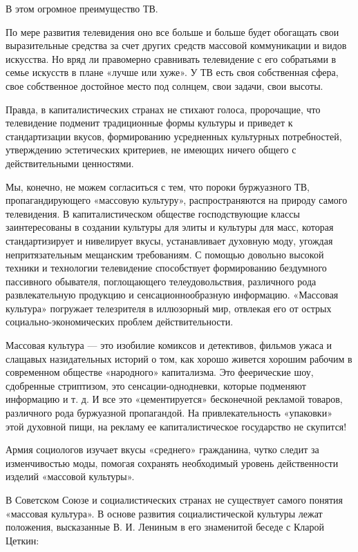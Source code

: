 \documentclass[12pt, a4paper, openany]{book}
\begin{document}
В этом огромное преимущество ТВ. 

По мере развития телевидения оно все больше и больше будет обогащать свои выразительные средства за счет других средств массовой коммуникации и видов искусства. Но вряд ли правомерно сравнивать телевидение с его собратьями в семье искусств в плане «лучше или хуже». У ТВ есть своя собственная сфера, свое собственное достойное место под солнцем, свои задачи, свои высоты. 

Правда, в капиталистических странах не стихают голоса, пророчащие, что телевидение подменит традиционные формы культуры и приведет к стандартизации вкусов, формированию усредненных культурных потребностей, утверждению эстетических критериев, не имеющих ничего общего с действительными ценностями. 

Мы, конечно, не можем согласиться с тем, что пороки буржуазного ТВ, пропагандирующего «массовую культуру», распространяются на природу самого телевидения. В капиталистическом обществе господствующие классы заинтересованы в создании культуры для элиты и культуры для масс, которая стандартизирует и нивелирует вкусы, устанавливает духовную моду, угождая непритязательным мещанским требованиям. С помощью довольно высокой техники и технологии телевидение способствует формированию бездумного пассивного обывателя, поглощающего телеудовольствия, различного рода развлекательную продукцию и сенсационнообразную информацию. «Массовая культура» погружает телезрителя в иллюзорный мир, отвлекая его от острых социально-экономических проблем действительности. 

Массовая культура — это изобилие комиксов и детективов, фильмов ужаса и слащавых назидательных историй о том, как хорошо живется хорошим рабочим в современном обществе «народного» капитализма. Это феерические шоу, сдобренные стриптизом, это сенсации-однодневки, которые подменяют информацию и т. д. И все это «цементируется» бесконечной рекламой товаров, различного рода буржуазной пропагандой. На привлекательность «упаковки» этой духовной пищи, на рекламу ее капиталистическое государство не скупится! 

Армия социологов изучает вкусы «среднего» гражданина, чутко следит за изменчивостью моды, помогая сохранять необходимый уровень действенности изделий «массовой культуры».

В Советском Союзе и социалистических странах не существует самого понятия «массовая культура». В основе развития социалистической культуры лежат положения, высказанные В. И. Лениным в его знаменитой беседе с Кларой Цеткин: 
\end{document}
